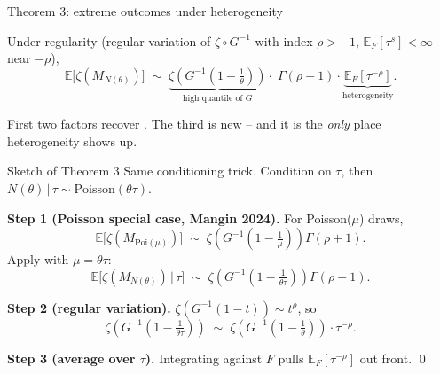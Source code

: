 \documentclass[aspectratio=169,xcolor=dvipsnames]{beamer}
\begin{document}
\begin{frame}{Theorem 3: extreme outcomes under heterogeneity}
    \begin{theorem}[Mangin, 2025]
        Under regularity (regular variation of $\zeta\circ G^{-1}$ with index $\rho>-1$, $\mathbb{E}_F[\tau^s]<\infty$ near $-\rho$),
        \[
            \mathbb{E}\!\bigl[\zeta(M_{N(\theta)})\bigr]
            \;\sim\;
            \underbrace{\zeta\!\left(G^{-1}\!\left(1-\tfrac{1}{\theta}\right)\right)}_{\text{high quantile of }G}
            \cdot\;
            \Gamma(\rho+1)
            \cdot
            \underbrace{\mathbb{E}_F\!\left[\tau^{-\rho}\right]}_{\text{heterogeneity}}.
        \]
    \end{theorem}
    \vspace{3mm}
    First two factors recover \citet{gabaix2016extreme}. The third is new -- and it is the \emph{only} place heterogeneity shows up.
\end{frame}

\begin{frame}{Sketch of Theorem 3}
    Same conditioning trick. Condition on $\tau$, then $N(\theta)\,|\,\tau\sim\text{Poisson}(\theta\tau)$.

    \vspace{2mm}
    \textbf{Step 1 (Poisson special case, Mangin 2024).} For Poisson($\mu$) draws,
    \[
        \mathbb{E}\bigl[\zeta(M_{\text{Poi}(\mu)})\bigr] \;\sim\; \zeta\!\left(G^{-1}\!\left(1-\tfrac{1}{\mu}\right)\right)\Gamma(\rho+1).
    \]
    Apply with $\mu = \theta\tau$:
    \[
        \mathbb{E}\bigl[\zeta(M_{N(\theta)}) \,\big|\, \tau\bigr]
        \;\sim\; \zeta\!\left(G^{-1}\!\left(1-\tfrac{1}{\theta\tau}\right)\right)\Gamma(\rho+1).
    \]

    \vspace{1mm}
    \textbf{Step 2 (regular variation).} $\zeta(G^{-1}(1-t)) \sim t^\rho$, so
    \[
        \zeta\!\left(G^{-1}\!\left(1-\tfrac{1}{\theta\tau}\right)\right) \;\sim\; \zeta\!\left(G^{-1}\!\left(1-\tfrac{1}{\theta}\right)\right)\cdot \tau^{-\rho}.
    \]

    \vspace{1mm}
    \textbf{Step 3 (average over $\tau$).} Integrating against $F$ pulls $\mathbb{E}_F[\tau^{-\rho}]$ out front. \qed
\end{frame}
\end{document}
